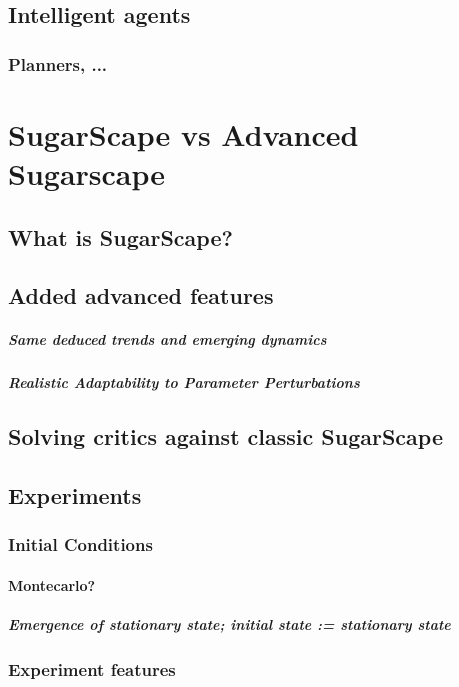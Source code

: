 \documentclass{report}
\begin{document}
	\section{Intelligent agents}
	  \subsection{Planners, ...}
\newpage 	
\chapter{SugarScape vs Advanced Sugarscape}
	\section{What is SugarScape?}
	\section{Added advanced features}
		\paragraph{Same deduced trends and emerging dynamics}
		\paragraph{Realistic Adaptability to Parameter Perturbations}
	\section{Solving critics against classic SugarScape}
	\section{Experiments}	
		\subsection{Initial Conditions}
			\subsubsection{Montecarlo?} 
			\paragraph{Emergence of stationary state; initial state := stationary state}
		\subsection{Experiment features}
\end{document}
